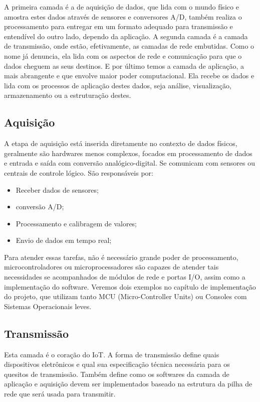A primeira camada é a de aquisição de dados, que lida com o mundo físico e amostra estes dados através de sensores e conversores A/D, também realiza o processamento para entregar em um formato adequado para transmissão e entendível do outro lado, dependo da aplicação. A segunda camada é a camada de transmissão, onde estão, efetivamente, as camadas de rede embutidas. Como o nome já denuncia, ela lida com os aspectos de rede e comunicação para que o dados cheguem as seus destinos. E por último temos a camada de aplicação, a mais abrangente e que envolve maior poder computacional. Ela recebe os dados e lida com os processos de aplicação destes dados, seja análise, visualização, armazenamento ou a estruturação destes.

\subsection{Aquisição}
\label{subsection:aquisicao}

A etapa de aquisição está inserida diretamente no contexto de dados físicos, geralmente são hardwares menos complexos, focados em processamento de dados e entrada e saída com conversão analógico-digital. Se comunicam com sensores ou centrais de controle lógico. São responsáveis por:

\begin{itemize}
	\item Receber dados de sensores;
	\item conversão A/D;
	\item Processamento e calibragem de valores;
	\item Envio de dados em tempo real;
\end{itemize} 

Para atender essas tarefas, não é necessário grande poder de processamento, microcontroladores ou microprocessadores são capazes de atender tais necessidades se acompanhados de módulos de rede e portas I/O, assim como a implementação do software. Veremos dois exemplos no capítulo de implementação do projeto, que utilizam tanto MCU (Micro-Controller Units) ou Consoles com Sistemas Operacionais leves.
 

\subsection{Transmissão}
\label{subsection:transmicao}

Esta camada é o coração do IoT. A forma de transmissão define quais dispositivos eletrônicos e qual sua especificação técnica necessária para os quesitos de transmissão. Também define como os softwares da camada de aplicação e aquisição devem ser implementados baseado na estrutura da pilha de rede que será usada para transmitir.

